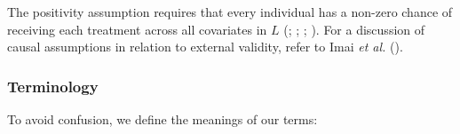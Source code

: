 \documentclass[
  single column]{article}
\begin{document}
The positivity assumption requires that every individual has a non-zero
chance of receiving each treatment across all covariates in \(L\)
(;
;
;
). For a discussion
of causal assumptions in relation to external validity, refer to Imai
\emph{et al.} ().

\subsubsection{Terminology}\label{terminology}

To avoid confusion, we define the meanings of our terms:
\end{document}
